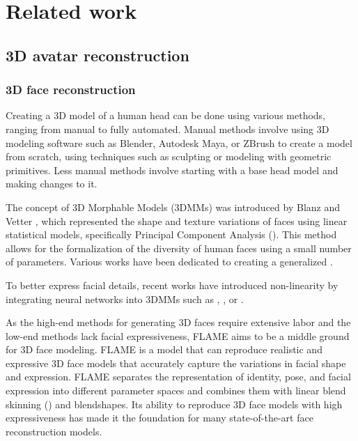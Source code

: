\section{Related work}
\label{sec:related-work}

\subsection{3D avatar reconstruction}

\subsubsection{3D face reconstruction}

Creating a 3D model of a human head can be done using various methods, ranging from manual to fully automated. Manual methods involve using 3D modeling software such as Blender, Autodesk Maya, or ZBrush to create a model from scratch, using techniques such as sculpting or modeling with geometric primitives. Less manual methods involve starting with a base head model and making changes to it.

The concept of 3D Morphable Models (3DMMs) was introduced by Blanz and Vetter \cite{blanzMorphableModelSynthesis1999}, which represented the shape and texture variations of faces using linear statistical models, specifically Principal Component Analysis (). This method allows for the formalization of the diversity of human faces using a small number of parameters. Various works \cite{paysan3DFaceModel2009,gerigMorphableFaceModels2018,caoFaceWarehouse3DFacial2014,liLearningModelFacial2017,yangFaceScapeLargeScaleHigh2020} have been dedicated to creating a generalized .

To better express facial details, recent works have introduced non-linearity by integrating neural networks into 3DMMs such as  \cite{ranjanGenerating3DFaces2018},  \cite{gecerFastGANFITGenerativeAdversarial2022}, or  \cite{galanakis3DMMRFConvolutionalRadiance2023,hongHeadNeRFRealTimeNeRFBased2022}.


As the high-end methods for generating 3D faces require extensive labor and the low-end methods lack facial expressiveness, FLAME \cite{liLearningModelFacial2017} aims to be a middle ground for 3D face modeling. FLAME is a  model that can reproduce realistic and expressive 3D face models that accurately capture the variations in facial shape and expression. FLAME separates the representation of identity, pose, and facial expression into different parameter spaces and combines them with linear blend skinning () and blendshapes. Its ability to reproduce 3D face models with high expressiveness has made it the foundation for many state-of-the-art face reconstruction models.

